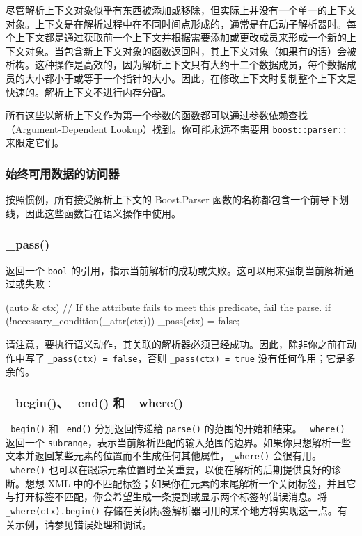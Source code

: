 尽管解析上下文对象似乎有东西被添加或移除，但实际上并没有一个单一的上下文对象。上下文是在解析过程中在不同时间点形成的，通常是在启动子解析器时。每个上下文都是通过获取前一个上下文并根据需要添加或更改成员来形成一个新的上下文对象。当包含新上下文对象的函数返回时，其上下文对象（如果有的话）会被析构。这种操作是高效的，因为解析上下文只有大约十二个数据成员，每个数据成员的大小都小于或等于一个指针的大小。因此，在修改上下文时复制整个上下文是快速的。解析上下文不进行内存分配。

\begin{marker}
所有这些以解析上下文作为第一个参数的函数都可以通过参数依赖查找（Argument-Dependent Lookup）找到。你可能永远不需要用 \texttt{boost::parser::} 来限定它们。
\end{marker}

\subsubsection{始终可用数据的访问器}

按照惯例，所有接受解析上下文的 Boost.Parser 函数的名称都包含一个前导下划线，因此这些函数旨在语义操作中使用。

\subsubsection{\_pass()}

 返回一个 \texttt{bool} 的引用，指示当前解析的成功或失败。这可以用来强制当前解析通过或失败：

\begin{code}
[](auto & ctx) {
    // If the attribute fails to meet this predicate, fail the parse.
    if (!necessary_condition(_attr(ctx)))
        _pass(ctx) = false;
}
\end{code}

请注意，要执行语义动作，其关联的解析器必须已经成功。因此，除非你之前在动作中写了 \texttt{\_pass(ctx) = false}，否则 \texttt{\_pass(ctx) = true} 没有任何作用；它是多余的。

\subsubsection{\_begin()、\_end() 和 \_where()}

\texttt{\_begin()} 和 \texttt{\_end()} 分别返回传递给 \texttt{parse()} 的范围的开始和结束。 \texttt{\_where()} 返回一个 \texttt{subrange}，表示当前解析匹配的输入范围的边界。如果你只想解析一些文本并返回某些元素的位置而不生成任何其他属性，\texttt{\_where()} 会很有用。 \texttt{\_where()} 也可以在跟踪元素位置时至关重要，以便在解析的后期提供良好的诊断。想想 XML 中的不匹配标签；如果你在元素的末尾解析一个关闭标签，并且它与打开标签不匹配，你会希望生成一条提到或显示两个标签的错误消息。将 \texttt{\_where(ctx).begin()} 存储在关闭标签解析器可用的某个地方将实现这一点。有关示例，请参见错误处理和调试。

